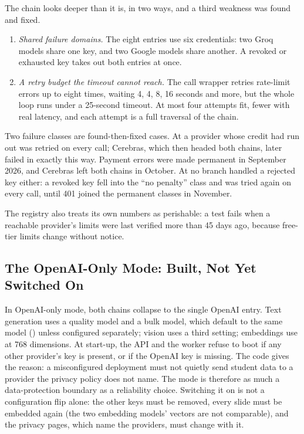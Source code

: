 The chain looks deeper than it is, in two ways, and a third weakness was
found and fixed.
\begin{enumerate}
  \item \emph{Shared failure domains.} The eight entries use six credentials:
    two Groq models share one key, and two Google models share another. A revoked
    or exhausted key takes out both entries at once.
  \item \emph{A retry budget the timeout cannot reach.} The call wrapper retries
    rate-limit errors up to eight times, waiting 4, 4, 8, 16 seconds and more,
    but the whole loop runs under a 25-second timeout. At most four attempts
    fit, fewer with real latency, and each attempt is a full traversal of the
    chain.
\end{enumerate}
Two failure classes are found-then-fixed cases. At \code{\thesisEarlierCommit}
a provider whose credit had run out was retried on every call; Cerebras, which
then headed both chains, later failed in exactly this way. Payment errors were
made permanent in September 2026, and Cerebras left both chains in October. At
\code{\thesisPreviousCommit} no branch handled a rejected key either: a revoked
key fell into the ``no penalty'' class and was tried again on every call, until
401 joined the permanent classes in November.

The registry also treats its own numbers as perishable: a test fails when a
reachable provider's limits were last verified more than 45 days ago, because
free-tier limits change without notice.

\subsection{The OpenAI-Only Mode: Built, Not Yet Switched On}
\label{sec:openai-only}

In OpenAI-only mode, both chains collapse to the single OpenAI entry. Text
generation uses a quality model and a bulk model, which default to the same model
() unless configured separately; vision uses a third setting;
embeddings use  at 768 dimensions. At start-up, the
API and the worker refuse to boot if any other provider's key is present, or if
the OpenAI key is missing. The code gives the reason: a misconfigured deployment
must not quietly send student data to a provider the privacy policy does not
name. The mode is therefore as much a data-protection boundary as a reliability
choice. Switching it on is not a configuration flip alone: the other keys must be
removed, every slide must be embedded again (the two embedding models' vectors
are not comparable), and the privacy pages, which name the providers, must change
with it.

